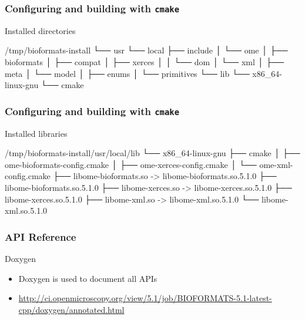 \documentclass{beamer}
\begin{document}
\begin{frame}[fragile]
  \frametitle{Configuring and building with \texttt{cmake}}
\begin{block}{Installed directories}
  \begin{semiverbatim}\tiny
/tmp/bioformats-install
└── usr
    └── local
        ├── include
        │   └── ome
        │       ├── bioformats
        │       ├── compat
        │       ├── xerces
        │       │   └── dom
        │       └── xml
        │           ├── meta
        │           └── model
        │               ├── enums
        │               └── primitives
        └── lib
            └── x86_64-linux-gnu
                └── cmake
\end{semiverbatim}
\end{block}
\end{frame}

\begin{frame}[fragile]
  \frametitle{Configuring and building with \texttt{cmake}}
\begin{block}{Installed libraries}
  \begin{semiverbatim}\scriptsize
/tmp/bioformats-install/usr/local/lib
└── x86_64-linux-gnu
    ├── cmake
    │   ├── ome-bioformats-config.cmake
    │   ├── ome-xerces-config.cmake
    │   └── ome-xml-config.cmake
    ├── libome-bioformats.so -> libome-bioformats.so.5.1.0
    ├── libome-bioformats.so.5.1.0
    ├── libome-xerces.so -> libome-xerces.so.5.1.0
    ├── libome-xerces.so.5.1.0
    ├── libome-xml.so -> libome-xml.so.5.1.0
    └── libome-xml.so.5.1.0
\end{semiverbatim}
\end{block}
\end{frame}

\begin{frame}[fragile]
  \frametitle{API Reference}
\begin{block}{Doxygen}
  \begin{itemize}
  \item Doxygen is used to document all APIs
    \item \url{http://ci.openmicroscopy.org/view/5.1/job/BIOFORMATS-5.1-latest-cpp/doxygen/annotated.html}
  \end{itemize}
\end{block}
\end{frame}
\end{document}
